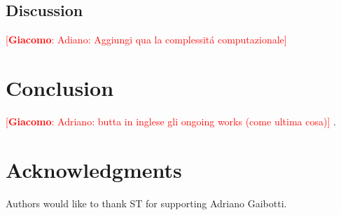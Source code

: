 \documentclass{llncs}
\newcommand{\gi}[1]{{\textcolor{red}{[\small \textbf{Giacomo}: #1]}}}
\begin{document}

\subsection{Discussion}
\gi{Adiano: Aggiungi qua la complessit\'a computazionale}

\section{Conclusion}\label{sec:Conclusion}
\gi{Adriano: butta in inglese gli ongoing works (come ultima cosa)}
.

\section*{Acknowledgments}\label{sec:Acknowledgments}
Authors would like to thank ST for supporting Adriano Gaibotti.




%	
%	
\end{document}
